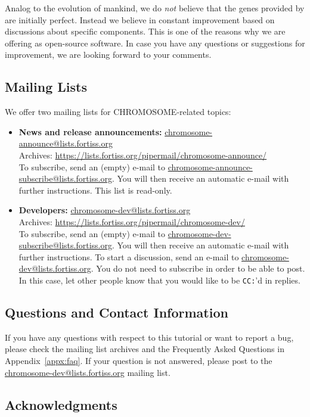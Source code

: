 Analog to the evolution of mankind, we do \emph{not} believe that the genes provided by \xme are initially perfect.
Instead we believe in constant improvement based on discussions about specific components.
This is one of the reasons why we are offering \xme as open-source software.
In case you have any questions or suggestions for improvement, we are looking forward to your comments.

\subsection{Mailing Lists}

We offer two mailing lists for CHROMOSOME-related topics:
\begin{itemize}
	\item \textbf{News and release announcements:} \url{chromosome-announce@lists.fortiss.org} \\
		Archives: \url{https://lists.fortiss.org/pipermail/chromosome-announce/} \\
		To subscribe, send an (empty) e-mail to \url{chromosome-announce-subscribe@lists.fortiss.org}.
		You will then receive an automatic e-mail with further instructions.
		This list is read-only.
	\item \textbf{Developers:} \url{chromosome-dev@lists.fortiss.org} \\
		Archives: \url{https://lists.fortiss.org/pipermail/chromosome-dev/} \\
		To subscribe, send an (empty) e-mail to \url{chromosome-dev-subscribe@lists.fortiss.org}.
		You will then receive an automatic e-mail with further instructions.
		To start a discussion, send an e-mail to \url{chromosome-dev@lists.fortiss.org}.
		You do not need to subscribe in order to be able to post.
		In this case, let other people know that you would like to be \texttt{CC:}'d in replies.
\end{itemize}

\subsection{Questions and Contact Information}

If you have any questions with respect to this tutorial or want to report a bug,
please check the mailing list archives and the Frequently Asked Questions in Appendix~\ref{appx:faq}.
If your question is not answered, please post to the \url{chromosome-dev@lists.fortiss.org} mailing list.

\subsection{Acknowledgments}

